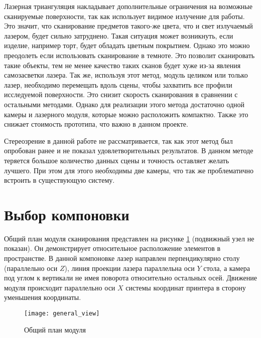         Лазерная триангуляция накладывает дополнительные ограничения на возможные сканируемые поверхности, так как использует видимое излучение для работы. Это значит, что сканирование предметов такого-же цвета, что и свет излучаемый лазером, будет сильно затруднено. Такая ситуация может возникнуть, если изделие, например торт, будет обладать цветным покрытием. Однако это можно преодолеть если использовать сканирование в темноте. Это позволит сканировать такие объекты, тем не менее качество таких сканов будет хуже из-за явления самозасветки лазера.
        Так же, используя этот метод, модуль целиком или только лазер, необходимо перемещать вдоль сцены, чтобы захватить все профили исследуемой поверхности. Это снизит скорость сканирования в сравнении с остальными методами.
        Однако для реализации этого метода достаточно одной камеры и лазерного модуля, которые можно расположить компактно. Также это снижает стоимость прототипа, что важно в данном проекте.

        Стереозрение в данной работе не рассматривается, так как этот метод был опробован ранее и не показал удовлетворительных результатов. В данном методе теряется большое количество данных сцены и точность оставляет желать лучшего. При этом для этого необходимы две камеры, что так же проблематично встроить в существующую систему\cite{SkripkoPASEKA}.
        
    \section{Выбор компоновки}
        Общий план модуля сканирования представлен на рисунке \ref{pic:general_view} (подвижный узел не показан). Он демонстрирует относительное расположение элементов в пространстве. В данной компоновке лазер направлен перпендикулярно столу (параллельно оси $ Z $), линия проекции лазера параллельна оси $ Y $ стола, а камера под углом к вертикали не имея поворота относительно остальных осей. Движение модуля происходит параллельно оси $ X $ системы координат принтера в сторону уменьшения координаты.

        \begin{figure}[H]
            \centering
            \texttt{[image: general\_view]}
            \caption{Общий план модуля}
            \label{pic:general_view}
        \end{figure}

